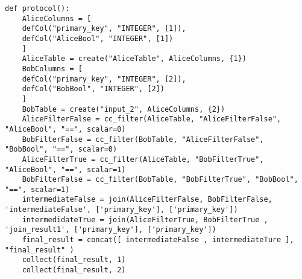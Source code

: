 \begin{lstlisting}[caption={Simpifiyed Protocol for our second use-case in Conclave}]
def protocol():
	AliceColumns = [
	defCol("primary_key", "INTEGER", [1]),
	defCol("AliceBool", "INTEGER", [1])
	]
	AliceTable = create("AliceTable", AliceColumns, {1})
	BobColumns = [
	defCol("primary_key", "INTEGER", [2]),
	defCol("BobBool", "INTEGER", [2])
	]
	BobTable = create("input_2", AliceColumns, {2})
	AliceFilterFalse = cc_filter(AliceTable, "AliceFilterFalse", "AliceBool", "==", scalar=0)
	BobFilterFalse = cc_filter(BobTable, "AliceFilterFalse", "BobBool", "==", scalar=0)
	AliceFilterTrue = cc_filter(AliceTable, "BobFilterTrue", "AliceBool", "==", scalar=1)
	BobFilterFalse = cc_filter(BobTable, "BobFilterTrue", "BobBool", "==", scalar=1)
	intermediateFalse = join(AliceFilterFalse, BobFilterFalse, 'intermediateFalse', ['primary_key'], ['primary_key'])
	intermedidateTrue = join(AliceFilterTrue, BobFilterTrue , 'join_result1', ['primary_key'], ['primary_key'])
	final_result = concat([ intermediateFalse , intermediateTure ], "final_result" )
	collect(final_result, 1)
	collect(final_result, 2)
\end{lstlisting}



